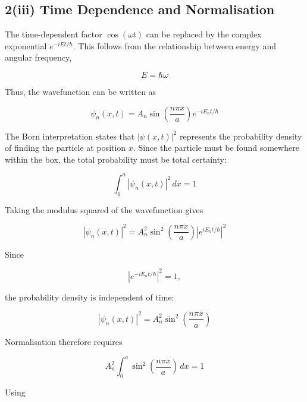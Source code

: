 \documentclass{article}
\begin{document}
\subsection*{2(iii) Time Dependence and Normalisation}

The time-dependent factor $\cos(\omega t)$ can be replaced by the
complex exponential $e^{-iEt/\hbar}$. This follows from the
relationship between energy and angular frequency,

\begin{equation*}
E=\hbar\omega
\end{equation*}

Thus, the wavefunction can be written as

\begin{equation*}
\psi_n(x,t) = A_n \sin\left(\frac{n\pi x}{a}\right) e^{-iE_nt/\hbar}
\end{equation*}

The Born interpretation states that $|\psi(x,t)|^2$ represents the
probability density of finding the particle at position $x$. Since
the particle must be found somewhere within the box, the total
probability must be total certainty:

\begin{equation*}
\int_0^a |\psi_n(x,t)|^2\,dx=1
\end{equation*}

Taking the modulus squared of the wavefunction gives

\begin{equation*}
|\psi_n(x,t)|^2 = A_n^2 \sin^2\left(\frac{n\pi x}{a}\right) \left|e^{ iE_nt/\hbar}\right|^2
\end{equation*}

Since

\begin{equation*}
\left|e^{-iE_nt/\hbar}\right|^2 = 1,
\end{equation*}

the probability density is independent of time:

\begin{equation*}
|\psi_n(x,t)|^2 = A_n^2 \sin^2\left(\frac{n\pi x}{a}\right)
\end{equation*}

Normalisation therefore requires

\begin{equation*}
A_n^2 \int_0^a \sin^2\left(\frac{n\pi x}{a}\right)\,dx = 1
\end{equation*}

Using
\end{document}
